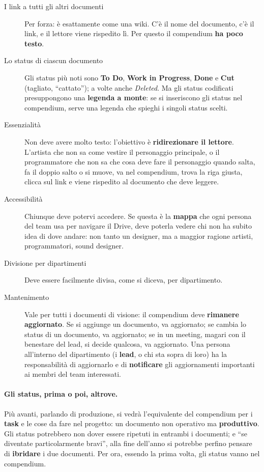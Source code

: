 \begin{description}
  \item[I link a tutti gli altri documenti] Per forza: è esattamente come una
        wiki. C'è il nome del documento, c'è il link, e il lettore viene
        rispedito lì. Per questo il compendium \textbf{ha poco testo}.
  \item[Lo status di ciascun documento] Gli status più noti sono
        \textbf{To Do}, \textbf{Work in Progress}, \textbf{Done} e
        \textbf{Cut} (tagliato, ``cattato''); a volte anche \emph{Deleted}.
        Ma gli status codificati presuppongono una \textbf{legenda a monte}:
        se si inseriscono gli status nel compendium, serve una legenda che
        spieghi i singoli status scelti.
  \item[Essenzialità] Non deve avere molto testo: l'obiettivo è
        \textbf{ridirezionare il lettore}. L'artista che non sa come vestire
        il personaggio principale, o il programmatore che non sa che cosa
        deve fare il personaggio quando salta, fa il doppio salto o si
        muove, va nel compendium, trova la riga giusta, clicca sul link e
        viene rispedito al documento che deve leggere.
  \item[Accessibilità] Chiunque deve potervi accedere. Se questa è la
        \textbf{mappa} che ogni persona del team usa per navigare il Drive,
        deve poterla vedere chi non ha subito idea di dove andare: non
        tanto un designer, ma a maggior ragione artisti, programmatori,
        sound designer.
  \item[Divisione per dipartimenti] Deve essere facilmente divisa, come si
        diceva, per dipartimento.
  \item[Mantenimento] Vale per tutti i documenti di visione: il compendium
        deve \textbf{rimanere aggiornato}. Se si aggiunge un documento, va
        aggiornato; se cambia lo status di un documento, va aggiornato; se
        in un meeting, magari con il benestare del lead, si decide qualcosa,
        va aggiornato. Una persona all'interno del dipartimento (i
        \textbf{lead}, o chi sta sopra di loro) ha la responsabilità di
        aggiornarlo e di \textbf{notificare} gli aggiornamenti importanti ai
        membri del team interessati.
\end{description}

\paragraph{Gli status, prima o poi, altrove.} Più avanti, parlando di
produzione, si vedrà l'equivalente del compendium per i \textbf{task} e le
cose da fare nel progetto: un documento non operativo ma
\textbf{produttivo}. Gli status potrebbero non dover essere ripetuti in
entrambi i documenti; e ``se diventate particolarmente bravi'', alla fine
dell'anno si potrebbe perfino pensare di \textbf{ibridare} i due documenti.
Per ora, essendo la prima volta, gli status vanno nel compendium.

